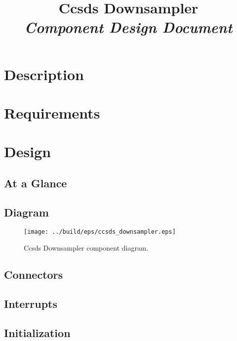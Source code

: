 



\title{\textbf{Ccsds Downsampler} \\
\large\textit{Component Design Document}}
\date{}
\maketitle

\section{Description}


\section{Requirements}


\section{Design}

\subsection{At a Glance}


\subsection{Diagram}
\begin{figure}[H]
  \texttt{[image: ../build/eps/ccsds\_downsampler.eps]}
  \caption{Ccsds Downsampler component diagram.}
\end{figure}

\subsection{Connectors}


\subsection{Interrupts}



\subsection{Initialization}


